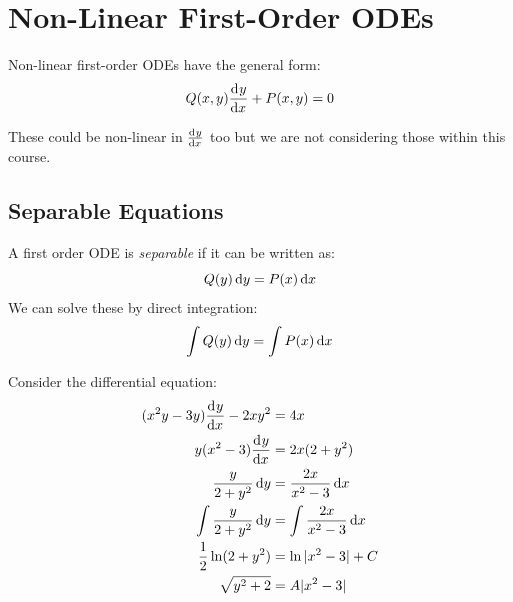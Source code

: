 \documentclass[../main.tex]{subfiles}
\begin{document}
\section{Non-Linear First-Order ODEs}
Non-linear first-order ODEs have the general form:
\begin{equation}
  \label{nonLinearGeneral}
  Q(x, y)\deriv{y}{x} + P(x, y) = 0
\end{equation}
\begin{remark}
  These could be non-linear in $\deriv{y}{x}$ too but we are not considering those within this course.
\end{remark}
\subsection{Separable Equations}
A first order ODE is \textit{separable} if it can be written as:
\[
  Q(y) \d{y} = P(x) \d{x}
\]
We can solve these by direct integration:
\[
  \int Q(y) \d{y} = \int P(x) \d{x}
\]
\begin{example}
  Consider the differential equation:
  \begin{align*}
    (x^2y - 3y)\deriv{y}{x} - 2xy^2 &= 4x \\
    y(x^2 - 3)\deriv{y}{x} &= 2x(2 + y^2) \\
    \frac{y}{2 + y^2} \d{y} &= \frac{2x}{x^2 -3} \d{x} \\
    \int \frac{y}{2 + y^2} \d{y} &= \int \frac{2x}{x^2 - 3} \d{x} \\
    \frac{1}{2}\ln(2 + y^2) &= \ln|x^2 - 3| + C \\
    \sqrt{y^2 + 2} &= A|x^2 - 3|
  \end{align*}
\end{example}
\end{document}

